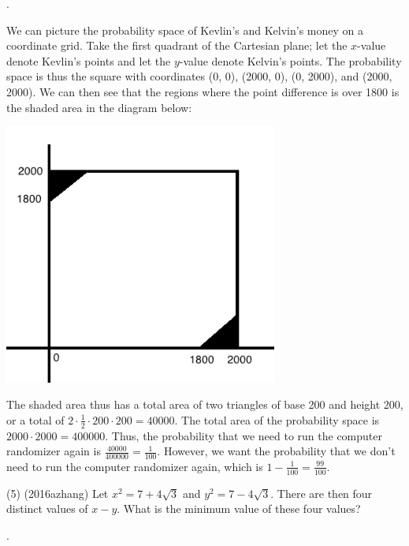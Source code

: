 \documentclass[11pt]{article}
\begin{document}
\begin{answer}
.
\end{answer}

\begin{solution}
We can picture the probability space of Kevlin's and Kelvin's money on a coordinate grid. Take the first quadrant of the Cartesian plane; let the $x$-value denote Kevlin's points and let the $y$-value denote Kelvin's points. The probability space is thus the square with coordinates (0, 0), (2000, 0), (0, 2000), and (2000, 2000). We can then see that the regions where the point difference is over 1800 is the shaded area in the diagram below:

\begin{center}
\includegraphics[width=9cm]{probspace.png}
\end{center}

The shaded area thus has a total area of two triangles of base 200 and height 200, or a total of $2\cdot\frac{1}{2}\cdot200\cdot200 = 40000$. The total area of the probability space is $2000\cdot2000=400000$. Thus, the probability that we need to run the computer randomizer again is $\frac{40000}{400000} = \frac{1}{100}$. However, we want the probability that we don't need to run the computer randomizer again, which is $1 - \frac{1}{100} = \boxed{\frac{99}{100}}$.
\end{solution}

\begin{problem}
(5) (2016azhang) Let $x^2 = 7 + 4\sqrt{3}$ and $y^2 = 7 - 4\sqrt{3}$. There are then four distinct values of $x-y$. What is the minimum value of these four values?
\end{problem}

\begin{answer}
.
\end{answer}
\end{document}
